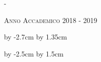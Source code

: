 \begin{titlingpage}
\begin{adjustwidth*}{\unitlength}{-\unitlength}
\begin{center}
\begin{center}
\end{center}




\vspace{4.8cm}


\textsc{Anno Accademico 2018 - 2019}\\[0.2cm]


\end{center}

\end{adjustwidth*}


\advance\hsize by -2.7cm %
\advance\hoffset by 1.35cm %


\end{titlingpage}


\advance\vsize by -2.5cm %
\advance\voffset by 1.5cm %






